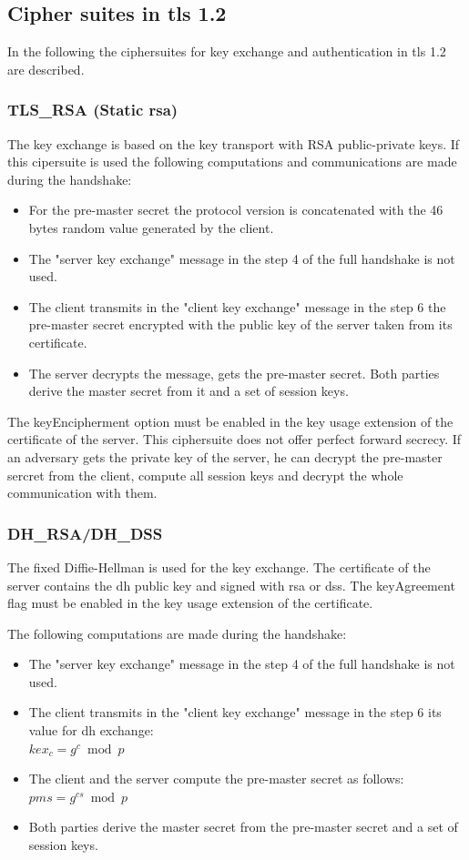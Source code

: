 \subsection{Cipher suites in \gls{tls} 1.2}
\label{subsec:ciphersuits1_2}

In the following the ciphersuites for key exchange and authentication in \gls{tls} 1.2 are described.

\subsubsection*{TLS\_RSA (Static \gls{rsa})} 
The key exchange is based on the key transport with RSA public-private keys.
If this cipersuite is used the following computations and communications are made during the handshake:
\begin{itemize}
	\item For the pre-master secret the protocol version is concatenated with the 46 bytes random value generated by the client.
	\item The "server key exchange" message in the step 4 of the full handshake is not used.
	\item The client transmits in the "client key exchange" message in the step 6 the pre-master secret encrypted with the public key of the server taken from its certificate.
	\item The server decrypts the message, gets the pre-master secret. Both parties derive the master secret from it and a set of session keys.
\end{itemize}

The keyEncipherment option must be enabled in the key usage extension of the certificate of the server.
This ciphersuite does not offer perfect forward secrecy. If an adversary gets the private key of the server, he can decrypt the pre-master sercret from the client, compute all session keys and decrypt the whole communication with them.

\subsubsection*{DH\_RSA/DH\_DSS}
The fixed Diffie-Hellman is used for the key exchange. The certificate of the server contains the \gls{dh} public key and signed with \gls{rsa} or \gls{dss}.
The keyAgreement flag must be enabled in the key usage extension of the certificate.

The following computations are made during the handshake:
\begin{itemize}
	\item The "server key exchange" message in the step 4 of the full handshake is not used.
	\item The client transmits in the "client key exchange" message in the step 6 its value for \gls{dh} exchange: \\ $\displaystyle kex_c = g^c \bmod p $ 
	\item The client and the server compute the pre-master secret as follows: $\displaystyle pms = g^{cs} \bmod p$
	\item Both parties derive the master secret from the pre-master secret and a set of session keys.
\end{itemize}


